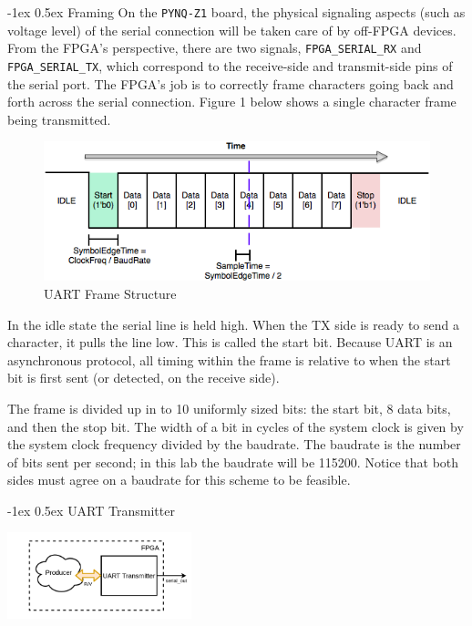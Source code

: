 \documentclass[11pt]{article}
\makeatletter
\renewcommand{\subsection}
{\@startsection {subsection}{1}{0pt}
 {-1ex}
 {0.5ex}
 {\bfseries\normalsize}}
\makeatother
\begin{document}
\subsection{Framing}
On the \verb|PYNQ-Z1| board, the physical signaling aspects (such as voltage level) of the serial connection will be taken care of by off-FPGA devices.
From the FPGA's perspective, there are two signals, \verb|FPGA_SERIAL_RX| and \verb|FPGA_SERIAL_TX|, which correspond to the receive-side and transmit-side pins of the serial port.
The FPGA's job is to correctly frame characters going back and forth across the serial connection.
Figure 1 below shows a single character frame being transmitted.

\begin{figure}[H]
  \centerline{\includegraphics[width=6in]{figs/uart_frame.png}}
  \caption{UART Frame Structure}
\end{figure}

In the idle state the serial line is held high.
When the TX side is ready to send a character, it pulls the line low.
This is called the start bit.
Because UART is an asynchronous protocol, all timing within the frame is relative to when the start bit is first sent (or detected, on the receive side).

The frame is divided up in to 10 uniformly sized bits: the start bit, 8 data bits, and then the stop bit.
The width of a bit in cycles of the system clock is given by the system clock frequency divided by the baudrate.
The baudrate is the number of bits sent per second; in this lab the baudrate will be 115200.
Notice that both sides must agree on a baudrate for this scheme to be feasible.

\subsection{UART Transmitter}

\begin{center}
\includegraphics[width=0.4\textwidth]{figs/uart_tx.png}
\end{center}
\end{document}
